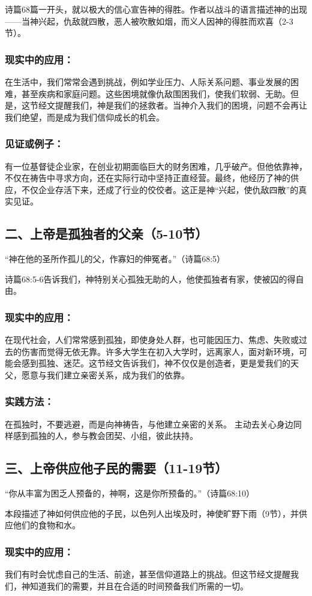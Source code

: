 \documentclass[a4paper, 12pt]{article}
\begin{document}
诗篇68篇一开头，就以极大的信心宣告神的得胜。作者以战斗的语言描述神的出现——当神兴起，仇敌就四散，恶人被吹散如烟，而义人因神的得胜而欢喜（2-3节）。
\subsubsection*{现实中的应用：}
在生活中，我们常常会遇到挑战，例如学业压力、人际关系问题、事业发展的困难，甚至疾病和家庭问题。这些困境就像仇敌围困我们，使我们软弱、无助。但是，这节经文提醒我们，神是我们的拯救者。当神介入我们的困境，问题不会再让我们绝望，而是成为我们信仰成长的机会。
\subsubsection*{见证或例子：}
有一位基督徒企业家，在创业初期面临巨大的财务困难，几乎破产。但他依靠神，不仅在祷告中寻求方向，还在实际行动中坚持正直经营。最终，他经历了神的供应，不仅企业存活下来，还成了行业的佼佼者。这正是神“兴起，使仇敌四散”的真实见证。
\subsection*{二、上帝是孤独者的父亲（5-10节）}
“神在他的圣所作孤儿的父，作寡妇的伸冤者。”（诗篇68:5）

诗篇68:5-6告诉我们，神特别关心孤独无助的人，他使孤独者有家，使被囚的得自由。
\subsubsection*{现实中的应用：}
在现代社会，人们常常感到孤独，即使身处人群，也可能因压力、焦虑、失败或过去的伤害而觉得无依无靠。许多大学生在初入大学时，远离家人，面对新环境，可能会感到孤独、迷茫。这节经文告诉我们，神不仅仅是创造者，更是爱我们的天父，愿意与我们建立亲密关系，成为我们的依靠。
\subsubsection*{实践方法：}
在孤独时，不要逃避，而是向神祷告，与他建立亲密的关系。
主动去关心身边同样感到孤独的人，参与教会团契、小组，彼此扶持。
\subsection*{三、上帝供应他子民的需要（11-19节）}
“你从丰富为困乏人预备的，神啊，这是你所预备的。”（诗篇68:10）

本段描述了神如何供应他的子民，以色列人出埃及时，神使旷野下雨（9节），并供应他们的食物和水。
\subsubsection*{现实中的应用：}
我们有时会忧虑自己的生活、前途，甚至信仰道路上的挑战。但这节经文提醒我们，神知道我们的需要，并且在合适的时间预备我们所需的一切。
\end{document}
